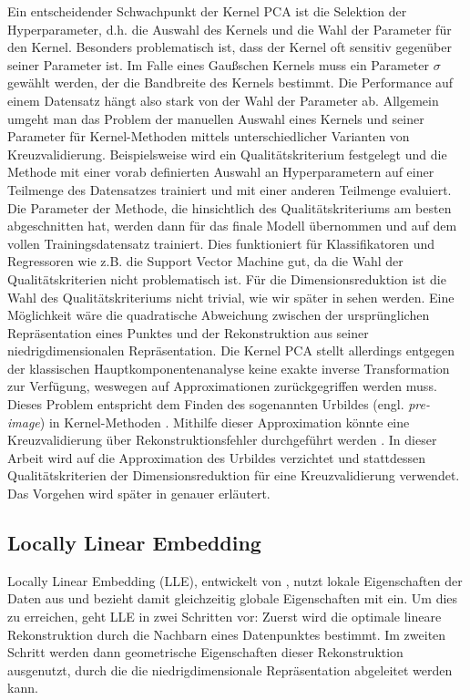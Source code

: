 Ein entscheidender Schwachpunkt der Kernel PCA ist die Selektion der Hyperparameter, d.h. die
Auswahl des Kernels und die Wahl der Parameter für den Kernel. Besonders problematisch ist, dass
der Kernel oft sensitiv gegenüber seiner Parameter ist. Im Falle eines Gaußschen Kernels muss ein
Parameter $\sigma$ gewählt werden, der die Bandbreite des Kernels bestimmt. Die Performance auf
einem Datensatz hängt also stark von der Wahl der Parameter ab. Allgemein umgeht man das Problem
der manuellen Auswahl eines Kernels und seiner Parameter für Kernel-Methoden mittels
unterschiedlicher Varianten von Kreuzvalidierung. Beispielsweise wird ein Qualitätskriterium
festgelegt und die Methode mit einer vorab definierten Auswahl an Hyperparametern auf einer
Teilmenge des Datensatzes trainiert und mit einer anderen Teilmenge evaluiert. Die Parameter der
Methode, die hinsichtlich des Qualitätskriteriums am besten abgeschnitten hat, werden dann für das
finale Modell übernommen und auf dem vollen Trainingsdatensatz trainiert. Dies funktioniert für
Klassifikatoren und Regressoren wie z.B. die Support Vector Machine gut, da die Wahl der
Qualitätskriterien nicht problematisch ist. Für die Dimensionsreduktion ist die Wahl des
Qualitätskriteriums nicht trivial, wie wir später in
 sehen werden. Eine Möglichkeit
wäre die quadratische Abweichung zwischen der ursprünglichen Repräsentation eines Punktes und der
Rekonstruktion aus seiner niedrigdimensionalen Repräsentation. Die Kernel PCA stellt allerdings
entgegen der klassischen Hauptkomponentenanalyse keine exakte inverse Transformation zur Verfügung,
weswegen auf Approximationen zurückgegriffen werden muss. Dieses Problem entspricht dem Finden des
sogenannten Urbildes (engl. \textit{pre-image}) in Kernel-Methoden \parencite{Kwok.2004}. Mithilfe dieser Approximation könnte eine Kreuzvalidierung über
Rekonstruktionsfehler durchgeführt werden \parencite[siehe z.B.][]{Alam.2014}. In dieser Arbeit wird auf die Approximation des Urbildes
verzichtet und stattdessen Qualitätskriterien der Dimensionsreduktion für eine Kreuzvalidierung
verwendet. Das Vorgehen wird später in 
genauer erläutert.
\subsection{Locally Linear Embedding}
\label{ch:MethodenDerDimRed:statistisch:LLE}
Locally Linear Embedding (LLE), entwickelt von \textcite{Roweis.2000}, nutzt lokale Eigenschaften der Daten aus und bezieht damit gleichzeitig globale Eigenschaften mit ein. Um dies zu erreichen, geht LLE in zwei Schritten vor: Zuerst wird die optimale lineare Rekonstruktion durch die Nachbarn eines Datenpunktes bestimmt. Im zweiten Schritt werden dann geometrische Eigenschaften dieser Rekonstruktion ausgenutzt, durch die die niedrigdimensionale Repräsentation abgeleitet werden kann.

